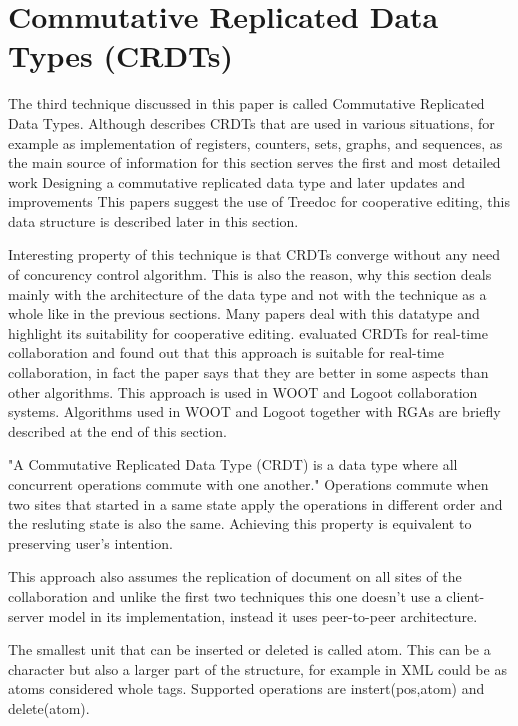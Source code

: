 \documentclass[12pt,oneside]{fithesis2}
\begin{document}
\section{Commutative Replicated Data Types (CRDTs)}
\par The third technique discussed in this paper is called Commutative Replicated Data Types. Although \cite{Shapiro-long} describes CRDTs that are used in various situations, for example as implementation of registers, counters, sets, graphs, and sequences, as the main source of information for this section serves the first and most detailed work Designing a commutative replicated data type \cite{Shapiro-design} and later updates and improvements \cite{Shapiro-editing} \cite{Shapiro-consistency} This papers suggest the use of Treedoc for cooperative editing, this data structure is described later in this section. 
\par Interesting property of this technique is that CRDTs converge without any need of concurency control algorithm. This is also the reason, why this section deals mainly with the architecture of the data type and not with the technique as a whole like in the previous sections. Many papers deal with this datatype and highlight its suitability for cooperative editing. \cite{CRDT-real} evaluated CRDTs for real-time collaboration and found out that this approach is suitable for real-time collaboration, in fact the paper says that they are better in some aspects than other algorithms. This approach is used in WOOT \cite{WOOT} and Logoot \cite{Logoot} collaboration systems. Algorithms used in WOOT and Logoot together with RGAs \cite{RGA} are briefly described at the end of this section.
\par "A Commutative Replicated Data Type (CRDT) is a data type where all concurrent operations commute with one another." \cite{Shapiro-design} Operations commute when two sites that started in a same state apply the operations in different order and the resluting state is also the same. Achieving this property is equivalent to preserving user's intention.
\par This approach also assumes the replication of document on all sites of the collaboration and unlike the first two techniques this one doesn't use a client-server model in its implementation, instead it uses peer-to-peer architecture.
\par The smallest unit that can be inserted or deleted is called atom. This can be a character but also a larger part of the structure, for example in XML could be as atoms considered whole tags. Supported operations are instert(pos,atom) and delete(atom). 
\end{document}
